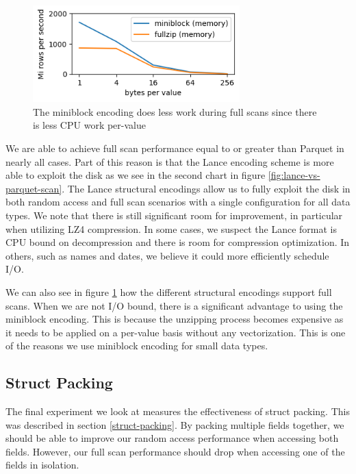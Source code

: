 \documentclass[sigconf, nonacm]{acmart}
\begin{document}
\begin{figure}[h]
    \centering
    \includegraphics[width=8cm]{figures/sized_scan.png}
    \caption{The miniblock encoding does less work during full scans since there is less CPU work per-value}
    \label{fig:sized-scan}
\end{figure}

We are able to achieve full scan performance equal to or greater than Parquet in nearly all cases.  Part of this reason is that the Lance encoding scheme is more able to exploit the disk as we see in the second chart in figure \ref{fig:lance-vs-parquet-scan}.  The Lance structural encodings allow us to fully exploit the disk in both random access and full scan scenarios with a single configuration for all data types.  We note that there is still significant room for improvement, in particular when utilizing LZ4 compression.  In some cases, we suspect the Lance format is CPU bound on decompression and there is room for compression optimization.  In others, such as names and dates, we believe it could more efficiently schedule I/O.

We can also see in figure \ref{fig:sized-scan} how the different structural encodings support full scans.  When we are not I/O bound, there is a significant advantage to using the miniblock encoding.  This is because the unzipping process becomes expensive as it needs to be applied on a per-value basis without any vectorization.  This is one of the reasons we use miniblock encoding for small data types.

\subsection{Struct Packing} \label{struct-packing-experiments}

The final experiment we look at measures the effectiveness of struct packing.  This was described in section \ref{struct-packing}.  By packing multiple fields together, we should be able to improve our random access performance when accessing both fields.  However, our full scan performance should drop when accessing one of the fields in isolation.
\end{document}
